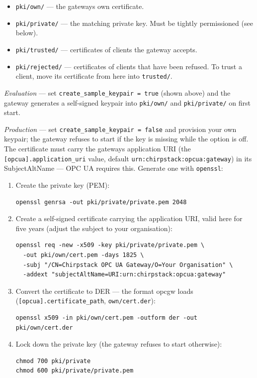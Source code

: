 \begin{itemize}
\item
  \texttt{pki/own/} --- the gateway\textquotesingle s own certificate.
\item
  \texttt{pki/private/} --- the matching private key. Must be tightly permissioned (see below).
\item
  \texttt{pki/trusted/} --- certificates of clients the gateway accepts.
\item
  \texttt{pki/rejected/} --- certificates of clients that have been refused. To trust a client, move its certificate from here into \texttt{trusted/}.
\end{itemize}

\emph{Evaluation} --- set \texttt{create\_sample\_keypair\ =\ true} (shown above) and the gateway generates a self-signed keypair into \texttt{pki/own/} and \texttt{pki/private/} on first start.

\emph{Production} --- set \texttt{create\_sample\_keypair\ =\ false} and provision your own keypair; the gateway refuses to start if the key is missing while the option is off. The certificate must carry the gateway\textquotesingle s application URI (the \texttt{{[}opcua{]}.application\_uri} value, default \texttt{urn:chirpstack:opcua:gateway}) in its SubjectAltName --- OPC UA requires this. Generate one with \texttt{openssl}:

\begin{enumerate}
\item
  Create the private key (PEM):

\begin{lstlisting}
openssl genrsa -out pki/private/private.pem 2048
\end{lstlisting}
\item
  Create a self-signed certificate carrying the application URI, valid here for five years (adjust the subject to your organisation):

\begin{lstlisting}
openssl req -new -x509 -key pki/private/private.pem \
  -out pki/own/cert.pem -days 1825 \
  -subj "/CN=Chirpstack OPC UA Gateway/O=Your Organisation" \
  -addext "subjectAltName=URI:urn:chirpstack:opcua:gateway"
\end{lstlisting}
\item
  Convert the certificate to DER --- the format opcgw loads (\texttt{{[}opcua{]}.certificate\_path}, \texttt{own/cert.der}):

\begin{lstlisting}
openssl x509 -in pki/own/cert.pem -outform der -out pki/own/cert.der
\end{lstlisting}
\item
  Lock down the private key (the gateway refuses to start otherwise):

\begin{lstlisting}
chmod 700 pki/private
chmod 600 pki/private/private.pem
\end{lstlisting}
\end{enumerate}

